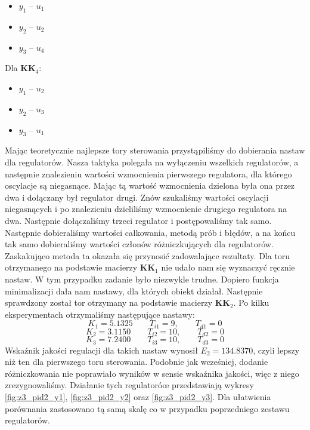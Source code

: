 \begin{itemize}
  \item $y_1$ -- $u_1$
 \item $y_2$ -- $u_2$
 \item $y_3$ -- $u_4$
\end{itemize}
Dla $\bm{KK}_4$:
\begin{itemize}
  \item $y_1$ -- $u_2$
 \item $y_2$ -- $u_3$
 \item $y_3$ -- $u_1$
\end{itemize}
Mając teoretycznie najlepsze tory sterowania przystąpiliśmy do dobierania nastaw
dla regulatorów. Nasza taktyka polegała na wyłączeniu wszelkich regulatorów, a
następnie znalezieniu wartości wzmocnienia pierwszego regulatora, dla którego
oscylacje są niegasnące. Mając tą wartość wzmocnienia dzielona była ona przez
dwa i dołączany był regulator drugi. Znów szukaliśmy wartości oscylacji niegasnących
i po znalezieniu dzieliliśmy wzmocnienie drugiego regulatora na dwa. Następnie
dołączaliśmy trzeci regulator i postępowaliśmy tak samo. Następnie dobieraliśmy
wartości całkowania, metodą prób i błędów, a na końcu tak samo dobieraliśmy
wartości członów różniczkujących dla regulatorów. Zaskakująco metoda ta okazała się
przynosić zadowalające rezultaty. Dla toru otrzymanego na podstawie macierzy $\bm{KK}_1$
nie udało nam się wyznaczyć ręcznie nastaw. W tym przypadku zadanie było niezwykle
trudne. Dopiero funkcja minimalizacji dała nam nastawy, dla których obiekt działał.
Następnie sprawdzony został tor otrzymany na podstawie macierzy $\bm{KK}_2$.
Po kilku eksperymentach otrzymaliśmy następujące nastawy:
\begin{equation}
  K_1 = \num{5.1325} \qquad T_{i1} = 9, \qquad T_{d1} = 0 \nonumber
\end{equation}
\begin{equation}
  K_2 = \num{3.1150} \qquad T_{i2} = 10, \qquad T_{d2} = 0
\end{equation}
\begin{equation}
  K_3 = \num{7.2400} \qquad T_{i3} = 10, \qquad T_{d3} = 0 \nonumber
\end{equation}
Wskaźnik jakości regulacji dla takich nastaw wynosił $E_2 = \num{134.8370}$, czyli
lepszy niż ten dla pierwszego
toru sterowania. Podobnie jak wcześniej, dodanie różniczkowania nie poprawiało
wyników w sensie wskaźnika jakości, więc z niego zrezygnowaliśmy. Działanie
tych regulatoróœ przedstawiają wykresy \ref{fig:z3_pid2_y1},
\ref{fig:z3_pid2_y2} oraz \ref{fig:z3_pid2_y3}. Dla ułatwienia porównania zastosowano
tą samą skalę co w przypadku poprzedniego zestawu regulatorów.

